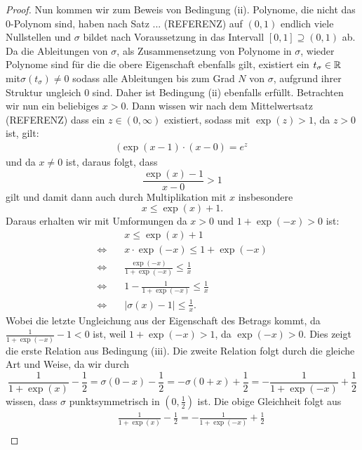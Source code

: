 \begin{proof}
Nun kommen wir zum Beweis von Bedingung (ii). Polynome, die nicht das $0$-Polynom sind, haben nach Satz ... (REFERENZ) auf $(0, 1)$ endlich viele Nullstellen und $\sigma$ bildet nach Voraussetzung in das Intervall $[0, 1] \supseteq (0, 1)$ ab. Da die Ableitungen von $\sigma$, als Zusammensetzung von Polynome in $\sigma$, wieder Polynome sind für die die obere Eigenschaft ebenfalls gilt, existiert ein $t_{\sigma} \in \mathbb{R}$ mit$\sigma(t_{\sigma}) \neq 0$ sodass alle Ableitungen bis zum Grad $N$ von $\sigma$, aufgrund ihrer Struktur ungleich $0$ sind. Daher ist Bedingung (ii) ebenfalls erfüllt.
Betrachten wir nun ein beliebiges $x > 0$. Dann wissen wir nach dem Mittelwertsatz (REFERENZ) dass ein $z \in (0, \infty)$ existiert, sodass mit $\exp(z) > 1$, da $z > 0$ ist, gilt$\colon$
\begin{equation*}
\begin{split}
(\exp(x - 1) \cdot (x - 0) = e^z
\end{split}
\end{equation*} 
und da $x \neq 0$ ist, daraus folgt, dass $$\frac{\exp(x) - 1}{x - 0} > 1$$ gilt und damit dann auch durch Multiplikation mit $x$ insbesondere $$ x \leq \exp(x) + 1.$$ Daraus erhalten wir mit Umformungen da $x > 0$ und $1 + \exp(-x) > 0$ ist$\colon$
\begin{equation*}
\begin{split}
& \quad x \leq \exp(x) + 1 \\
 \Leftrightarrow & \quad x \cdot \exp(-x) \leq 1 + \exp(-x) \\
 \Leftrightarrow & \quad \frac{\exp(-x)}{1 + \exp(-x)} \leq \frac{1}{x} \\
 \Leftrightarrow & \quad 1 - \frac{1}{1 + \exp(-x)} \leq \frac{1}{x} \\
 \Leftrightarrow & \quad |\sigma(x) - 1| \leq \frac{1}{x}.
\end{split}
\end{equation*}
Wobei die letzte Ungleichung aus der Eigenschaft des Betrags kommt, da $\frac{1}{1 + \exp(-x)} - 1< 0$ ist, weil $1 + \exp(-x) > 1$, da $\exp(-x) > 0$. Dies zeigt die erste Relation aus Bedingung (iii).
Die zweite Relation folgt durch die gleiche Art und Weise, da wir durch $$\frac{1}{1 + \exp(x)} - \frac{1}{2}= \sigma(0 - x) - \frac{1}{2} = -\sigma(0 + x) + \frac{1}{2} = -\frac{1}{1 + \exp(-x)} + \frac{1}{2}$$ 
wissen, dass $\sigma$ punktsymmetrisch in $(0, \frac{1}{2})$ ist. Die obige Gleichheit folgt aus
\begin{equation*}
\begin{split}
 & \quad \frac{1}{1 + \exp(x)} - \frac{1}{2} = -\frac{1}{1 + \exp(-x)} + \frac{1}{2} \\

\end{split}
\end{equation*}
\end{proof}
